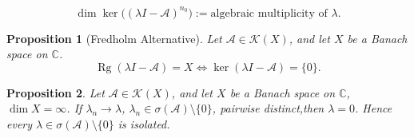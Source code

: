 \documentclass[12pt, oneside]{book}
\newtheorem{prop}{Proposition}[section]
\begin{document}
\[
\dim\ker\bigl((\lambda I-\mathscr{A})^{n_0}\bigr)
:=\text{algebraic multiplicity of }\lambda.
\]
\hspace{3mm}		
\begin{prop}[Fredholm Alternative]
Let	$\mathscr{A}\in\mathcal{K}(X)$, and let $X$ be a Banach space on $\mathbb{C}$.
\vspace{-2mm}	
	\[
	\operatorname{Rg}(\lambda I-\mathscr{A})=X
	\iff
	\ker(\lambda I-\mathscr{A})=\{0\}.
	\]
\end{prop}		
\begin{prop}
Let $\mathscr{A}\in\mathcal{K}(X)$, and let $X$ be a Banach space on $\mathbb{C}$, $\dim X=\infty$.
If $\lambda_n\to\lambda$,
$\lambda_n\in\sigma(\mathscr{A})\setminus\{0\}$,
pairwise distinct,then $\lambda=0$.
Hence every $\lambda\in\sigma(\mathscr{A})\setminus\{0\}$ is isolated.
\end{prop}
\end{document}
